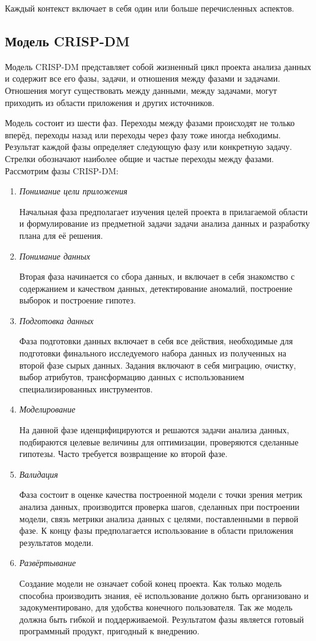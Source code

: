 Каждый контекст включает в себя один или больше перечисленных аспектов. 

\subsection{Модель CRISP-DM}
Модель CRISP-DM представляет собой жизненный цикл проекта анализа данных и содержит все его фазы, задачи, и отношения между фазами и задачами. Отношения могут существовать между данными, между задачами, могут приходить из области приложения и других источников. 

Модель состоит из шести фаз. Переходы между фазами происходят не только вперёд, переходы назад или переходы через фазу тоже иногда небходимы. Результат каждой фазы определяет следующую фазу или конкретную задачу. Стрелки обозначают наиболее общие и частые переходы между фазами. Рассмотрим фазы CRISP-DM:
\begin{enumerate}
	\item \textit{Понимание цели приложения}

	Начальная фаза предполагает изучения целей проекта в прилагаемой области и формулирование из предметной задачи задачи анализа данных и разработку плана для её решения.
	\item \textit{Понимание данных}

	Вторая фаза начинается со сбора данных, и включает в себя знакомство с содержанием и качеством данных, детектирование аномалий, построение выборок и построение гипотез.
	\item \textit{Подготовка данных}

	Фаза подготовки данных включает в себя все действия, необходимые для подготовки финального исследуемого набора данных из полученных на второй фазе сырых данных. Задания включают в себя миграцию, очистку, выбор атрибутов, трансформацию данных с использованием специализированных инструментов.
	\item \textit{Моделирование}

	На данной фазе иденцифицируются и решаются задачи анализа данных, подбираются целевые величины для оптимизации, проверяются сделанные гипотезы. Часто требуется возвращение ко второй фазе.
	\item \textit{Валидация}

	Фаза состоит в оценке качества построенной модели с точки зрения метрик анализа данных, производится проверка шагов, сделанных при построении модели, связь метрики анализа данных с целями, поставленными в первой фазе. К концу фазы предполагается использование в области приложения результатов модели.
	\item \textit{Развёртывание}

	Создание модели не означает собой конец проекта. Как только модель способна производить знания, её использование должно быть организовано и задокументировано, для удобства конечного пользователя. Так же модель должна быть гибкой и поддерживаемой. Результатом фазы является готовый программный продукт, пригодный к внедрению.
\end{enumerate}  
